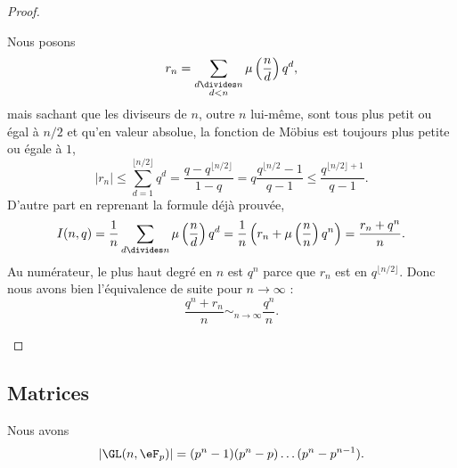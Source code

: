 \begin{proof}
\begin{enumerate}
            Nous posons
            \begin{equation}
                r_n=\sum_{\substack{d\divides n\\d<n}}\mu\left( \frac{ n }{ d } \right)q^d,
            \end{equation}
            mais sachant que les diviseurs de \( n\), outre \( n\) lui-même, sont tous plus petit ou égal à \( n/2\) et qu'en valeur absolue, la fonction de Möbius est toujours plus petite ou égale à \( 1\),
            \begin{equation}
                | r_n |\leq\sum_{d=1}^{\lfloor n/2\rfloor}q^d=\frac{ q-q^{\lfloor n/2\rfloor} }{ 1-q }=q\frac{ q^{\lfloor n/2}-1 }{ q-1 }\leq \frac{ q^{\lfloor n/2 \rfloor+1} }{ q-1 }.
            \end{equation}
            D'autre part en reprenant la formule déjà prouvée,
            \begin{equation}
                I(n,q)=\frac{1}{ n }\sum_{d\divides n}\mu\left( \frac{ n }{ d } \right)q^d=\frac{1}{ n }\left( r_n+\mu\left( \frac{ n }{ n } \right)q^n \right)=\frac{ r_n+q^n }{ n }.
            \end{equation}
            Au numérateur, le plus haut degré en \( n\) est \( q^n\) parce que \( r_n\) est en \( q^{\lfloor n/2\rfloor}\). Donc nous avons bien l'équivalence de suite pour \( n\to \infty\) :
            \begin{equation}
                \frac{ q^n+r_n }{ n }\sim_{n\to\infty}\frac{ q^n }{ n }.
            \end{equation}
    \end{enumerate}
\end{proof}

\subsection{Matrices}

\begin{proposition}
    Nous avons
    \begin{equation}
        | \GL(n,\eF_p) |=(p^n-1)(p^n-p)\ldots (p^n-p^{n-1}).
    \end{equation}
\end{proposition}

